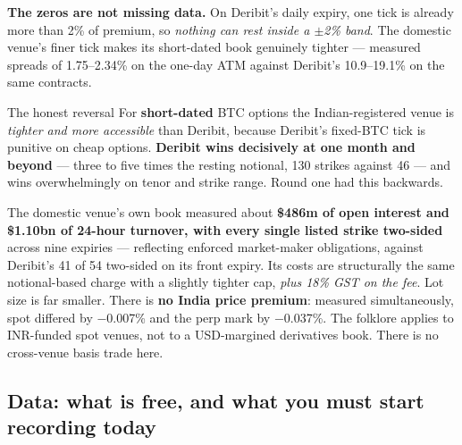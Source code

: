 \documentclass[11pt,a4paper]{article}
\begin{document}
\textbf{The zeros are not missing data.} On Deribit's daily expiry, one tick is
already more than 2\% of premium, so \emph{nothing can rest inside a $\pm$2\%
band}. The domestic venue's finer tick makes its short-dated book genuinely
tighter --- measured spreads of 1.75--2.34\% on the one-day ATM against Deribit's
10.9--19.1\% on the same contracts.

\begin{keyfact}{The honest reversal}
For \textbf{short-dated} BTC options the Indian-registered venue is \emph{tighter
and more accessible} than Deribit, because Deribit's fixed-BTC tick is punitive on
cheap options. \textbf{Deribit wins decisively at one month and beyond} --- three
to five times the resting notional, 130 strikes against 46 --- and wins
overwhelmingly on tenor and strike range. Round one had this backwards.
\end{keyfact}

The domestic venue's own book measured about \textbf{\$486m of open interest and
\$1.10bn of 24-hour turnover, with every single listed strike two-sided} across
nine expiries --- reflecting enforced market-maker obligations, against Deribit's
41 of 54 two-sided on its front expiry. Its costs are structurally the same
notional-based charge with a slightly tighter cap, \emph{plus 18\% GST on the
fee}. Lot size is far smaller. There is \textbf{no India price premium}: measured
simultaneously, spot differed by $-$0.007\% and the perp mark by $-$0.037\%. The
folklore applies to INR-funded spot venues, not to a USD-margined derivatives
book. There is no cross-venue basis trade here.

\subsection{Data: what is free, and what you must start recording today}
\end{document}
